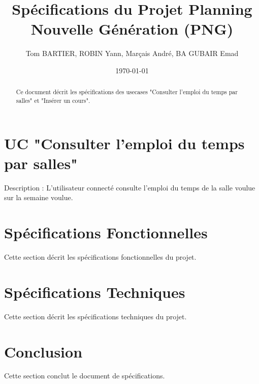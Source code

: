 \documentclass[12pt,a4paper]{article}
\title{Spécifications du Projet Planning Nouvelle Génération (PNG)}
\author{Tom BARTIER, ROBIN Yann, Marçais André, BA GUBAIR Emad}
\date{\today}
\begin{document}
\maketitle

\begin{abstract}
    Ce document décrit les spécifications des usecases "Consulter l'emploi du temps par salles" et 
    "Insérer un cours".
\end{abstract}

\section{UC "Consulter l'emploi du temps par salles"}
Description : L'utilisateur connecté consulte l'emploi du temps de la salle voulue sur la semaine voulue.\\


\section{Spécifications Fonctionnelles}
Cette section décrit les spécifications fonctionnelles du projet.

\section{Spécifications Techniques}
Cette section décrit les spécifications techniques du projet.

\section{Conclusion}
Cette section conclut le document de spécifications.
\end{document}

